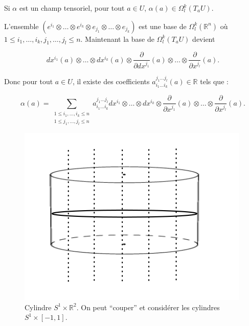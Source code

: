 \documentclass[french]{article}
\theoremstyle{definition}
\theoremstyle{remark}
\begin{document}
Si \(\alpha\) est un champ tensoriel, pour tout \(a \in U\), \(\alpha(a) \in \Omega _{l}^{k}(T_a U)\).

L'ensemble \((e ^{i_1} \otimes \dots \otimes e ^{i_k} \otimes e _{j_1} \otimes \dots \otimes e _{j_k})\) est une base de \(\Omega _{l}^{k}(\mathbb{R}^n)\) où \(1 \leq i_1, \dots, i_k, j_1, \dots, j_l \leq  n\). Maintenant la base de \(\Omega^{k}_{l}(T_a U)\) devient

\[d x ^{i_1}(a) \otimes \dots \otimes d x ^{i_k}(a) \otimes \frac{\partial }{\partial d x ^{j_1} }(a) \otimes \dots \otimes \frac{\partial  }{\partial x ^{j_l}}(a).\]

Donc pour tout \(a \in U\), il existe des coefficients \(a _{i_1 \dots i_k}^{j_1 \dots j_l}(a) \in \mathbb{R}\) tels que :

\[\alpha(a) = \sum_{\substack{1 \leq  i_1, \dots, i_k \leq  n \\ 1 \leq j_1, \dots, j_l \leq  n}}^{} a ^{j_1 \dots j_l}_{i_1 \dots i_k} d x ^{i_1} \otimes \dots \otimes d x ^{i_k} \otimes \frac{\partial  }{\partial x ^{j_1}}(a) \otimes \dots \otimes \frac{\partial  }{\partial x ^{j_l}}(a).\]

\begin{figure}[h!]
  \centering
  \includegraphics[scale=0.3]{figures/cylindre_tens.png}
  \caption{Cylindre \(S ^{1} \times \mathbb{R}^2\). On peut ``couper'' et considérer les cylindres \(S ^{1} \times [-1, 1]\).}
  \label{}
\end{figure}
\end{document}
